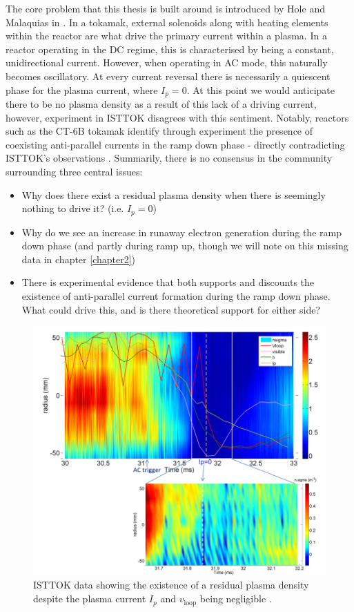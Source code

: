 The core problem that this thesis is built around is introduced by Hole and Malaquias in \cite{malaquias-matthew}.
In a tokamak, external solenoids along with heating elements within the reactor are 
what drive the primary current within a plasma. In a reactor operating in the DC regime, this is 
characterised by being a constant, unidirectional current. However, when operating in AC mode, 
this naturally becomes oscillatory. At every current reversal there is necessarily a quiescent phase 
for the plasma current, where $I_{p} = 0$. At this point we would anticipate there to be no plasma density 
as a result of this lack of a driving current, however, experiment in ISTTOK disagrees with this sentiment. 
Notably, reactors such as the CT-6B tokamak identify through experiment the presence of coexisting anti-parallel 
currents in the ramp down phase - directly contradicting ISTTOK's observations \cite{huang-ct-tokamak}. 
Summarily, there is no consensus in the community surrounding three central issues:
\begin{itemize}
    \item Why does there exist a residual plasma density when there is seemingly nothing to drive it? (i.e. $I_p = 0$)
    \item Why do we see an increase in runaway electron generation during the ramp down phase (and partly during 
    ramp up, though we will note on this missing data in chapter \ref{chapter2})
    \item There is experimental evidence that both supports and discounts the existence of anti-parallel current
    formation during the ramp down phase. What could drive this, and is there theoretical support for either side?
\end{itemize}

\begin{figure}[h!]
    \centering
    \includegraphics[scale=1]{imgs/c1/residual-plasma.png}
    \caption{ISTTOK data showing the existence of a residual plasma density despite the plasma current $I_p$ and 
    $v_{\text{loop}}$ being negligible \cite{malaquias-matthew}.}
\end{figure}

